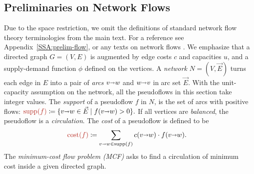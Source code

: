 \documentclass[a4paper,UKenglish]{socg-lipics-v2018}
\def\set#1{\{ #1 \}}
\def\fsupply{\phi}
\def\arcto{\mathord\shortrightarrow}
\def\arc#1#2{#1\arcto#2}
\def\cost{\operatorname{cost}}
\def\supp{\operatorname{supp}}
\theoremstyle{plain}
\numberwithin{figure}{section}
\def\EMPH#1{\textcolor{BrickRed}{{\emph{#1}}}}
\begin{document}
\subsection{Preliminaries on Network Flows}
\label{SS:prelim-flow}

Due to the space restriction, we omit the definitions of standard network flow theory terminologies from the main text.  For a reference see Appendix~\ref{SSA:prelim-flow}, or any texts on network flows \cite{O93,GHKT17}.
%
We emphasize that a directed graph $G=(V,E)$ is augmented by edge costs $c$ and capacities $u$, and a supply-demand function $\fsupply$ defined on the vertices.  A \EMPH{network $N = (V, \vec{E})$} turns each edge in $E$ into a pair of \EMPH{arcs} $\arc vw$ and $\arc wv$ in arc set $\vec{E}$.
With the unit-capacity assumption on the network, all the pseudoflows in this section take integer values.
The \EMPH{support} of a pseudoflow $f$ in $N$, is the set of arcs with positive flows:
\(
\EMPH{$\supp(f)$} \coloneqq \set{\arc vw \in \vec{E} \mid f(\arc vw) > 0}.
\)
If all vertices are \emph{balanced}, the pseudoflow is a \EMPH{circulation}.
The \EMPH{cost} of a pseudoflow
is defined to be
\[
 \EMPH{$\cost(f)$} \coloneqq \sum_{\arc vw \in \supp(f)} c(\arc vw) \cdot f(\arc vw).
\]
%
The \EMPH{minimum-cost flow problem (MCF)} asks to find a circulation of minimum cost inside a given directed graph.
\end{document}
